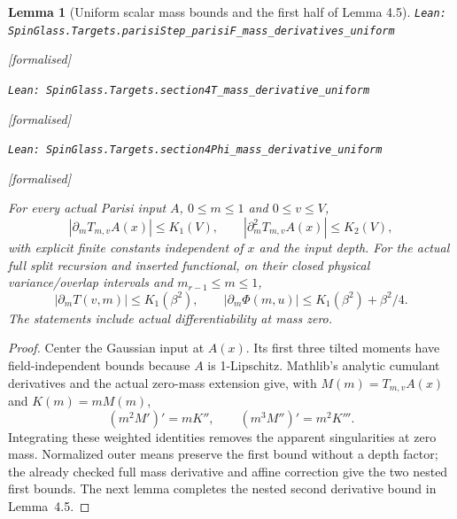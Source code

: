 \documentclass[11pt]{article}
\providecommand{\lean}[1]{\leavevmode\par\nopagebreak
  {\noindent\normalfont\footnotesize\raggedright\texttt{Lean: #1}\par}\nopagebreak}
\providecommand{\leanok}{\par\nopagebreak
  {\noindent\normalfont\footnotesize\textcolor{green!50!black}{[formalised]}\par}\nopagebreak}
\newtheorem{lemma}[theorem]{Lemma}
\begin{document}
\begin{lemma}[Uniform scalar mass bounds and the first half of Lemma 4.5]
\lean{SpinGlass.Targets.parisiStep\_parisiF\_mass\_derivatives\_uniform}\leanok
\lean{SpinGlass.Targets.section4T\_mass\_derivative\_uniform}\leanok
\lean{SpinGlass.Targets.section4Phi\_mass\_derivative\_uniform}\leanok
For every actual Parisi input $A$, $0\le m\le1$ and $0\le v\le V$,
\[
 |\partial_m T_{m,v}A(x)|\le K_1(V),\qquad
 |\partial_m^2 T_{m,v}A(x)|\le K_2(V),
\]
with explicit finite constants independent of $x$ and the input depth.
For the actual full split recursion and inserted functional, on their closed
physical variance/overlap intervals and $m_{r-1}\le m\le1$,
\[
 |\partial_m T(v,m)|\le K_1(\beta^2),\qquad
 |\partial_m\Phi(m,u)|\le K_1(\beta^2)+\beta^2/4.
\]
The statements include actual differentiability at mass zero.
\end{lemma}
\begin{proof}
Center the Gaussian input at $A(x)$. Its first three tilted moments have
field-independent bounds because $A$ is 1-Lipschitz. Mathlib's analytic
cumulant derivatives and the actual zero-mass extension give, with
$M(m)=T_{m,v}A(x)$ and $K(m)=mM(m)$,
\[
 (m^2M')'=mK'',\qquad (m^3M'')'=m^2K'''.
\]
Integrating these weighted identities removes the apparent singularities
at zero mass. Normalized outer means preserve the first bound without a
depth factor; the already checked full mass derivative and affine correction
give the two nested first bounds. The next lemma completes the nested second
derivative bound in Lemma~4.5.
\end{proof}
\end{document}
